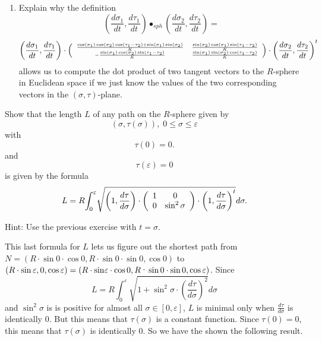 \documentclass{ximera}
\begin{document}
\begin{exercise}
\begin{enumerate}
\item Explain why the definition%
\[
\left(  \frac{d\sigma_{1}}{dt},\frac{d\tau_{1}}{dt}\right)  \bullet
_{sph}\left(  \frac{d\sigma_{2}}{dt},\frac{d\tau_{2}}{dt}\right)  =
\]
\[
\left(
\frac{d\sigma_{1}}{dt},\frac{d\tau_{1}}{dt}\right)  \cdot
\left({\tiny
\begin{array}{cc}
 \frac{\cos \left(\sigma _1\right) \cos \left(\sigma _2\right) \cos
   \left(\tau _1-\tau _2\right)+\sin \left(\sigma _1\right) \sin
   \left(\sigma _2\right)}{K} & \frac{\sin \left(\sigma _2\right)
   \cos \left(\sigma _1\right) \sin \left(\tau _1-\tau
   _2\right)}{K} \\
 -\frac{\sin \left(\sigma _1\right) \cos \left(\sigma _2\right)
   \sin \left(\tau _1-\tau _2\right)}{K} & \frac{\sin \left(\sigma
   _1\right) \sin \left(\sigma _2\right) \cos \left(\tau _1-\tau
   _2\right)}{K} \\
\end{array}}
\right)
\cdot\left(  \frac{d\sigma_{2}}{dt},\frac{d\tau_{2}}{dt}\right)  ^{t}%
\]
allows us to compute the dot product of two tangent vectors to the $R$-sphere
in Euclidean space if we just know the values of the two corresponding vectors
in the $\left(  \sigma,\tau\right)  $-plane.
\end{enumerate}
\end{exercise}

\begin{exercise}
 Show that the length $L$ of any path on the $R$-sphere given by%
\[
\left(  \sigma,\tau\left(  \sigma\right)  \right)  ,\;0\leq\sigma
\leq\varepsilon
\]
with%
\[
\tau\left(  0\right)  =0.
\]
and%
\[
\tau\left(  \varepsilon\right)  =0
\]
is given by the formula%
\[
L=R%
{\displaystyle\int\nolimits_{0}^{\varepsilon}}
\sqrt{\left(  1,\frac{d\tau}{d\sigma}\right)  \cdot\left(
\begin{array}
[c]{cc}%
1 & 0\\
0 & \sin^{2}\sigma
\end{array}
\right)  \cdot\left(  1,\frac{d\tau}{d\sigma}\right)  ^{t}}d\sigma.
\]


Hint: Use the previous exercise with $t=\sigma$.
\end{exercise}

This last formula for $L$ lets us figure out the shortest path from $N=\left(
R\cdot \sin 0\cdot %
\cos 0,R\cdot \sin %
0\cdot \sin 0,\cos 0\right)  $ to $\left(
R\cdot \sin \varepsilon,0,\cos %
\varepsilon\right)  =\left(  R\cdot \mathrm{sin\varepsilon
}\cdot \cos 0,R\text{\textperiodcentered
}\sin 0\cdot \sin 0,\cos %
\varepsilon\right)  $. Since%
\[
L=R%
{\displaystyle\int\nolimits_{0}^{\varepsilon}}
\sqrt{1+\sin ^{2}\sigma\cdot \left(  \frac{d\tau
}{d\sigma}\right)  ^{2}}d\sigma
\]
and $\sin ^{2}\sigma$ is is positive for almost all $\sigma\in\left[
0,\varepsilon\right]  $, $L$ is minimal only when $\frac{d\tau}{d\sigma}$ is
identically $0$. But this means that $\tau\left(  \sigma\right)  $ is a
constant function. Since $\tau\left(  0\right)  =0$, this means that
$\tau\left(  \sigma\right)  $ is identically $0$. So we have the shown the
following result.
\end{document}
